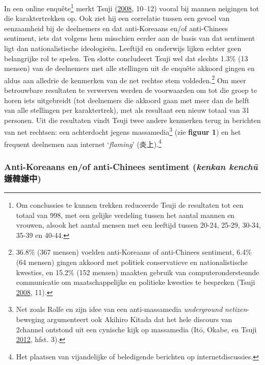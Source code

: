\documentclass[10.5pt,dutch,]{article}
\begin{document}
In een online enquête\footnote{Om conclussies te kunnen trekken
  reduceerde Tsuji de resultaten tot een totaal van 998, met een gelijke
  verdeling tussen het aantal mannen en vrouwen, alsook het aantal
  mensen met een leeftijd tussen 20-24, 25-29, 30-34, 35-39 en 40-44.}
merkt Tsuji (\protect\hyperlink{ref-tsujiux5fintanettoux5f2008}{2008},
10--12) vooral bij mannen neigingen tot die karaktertrekken op. Ook ziet
hij een correlatie tussen een gevoel van eenzaamheid bij de deelnemers
en dat anti-Koreaans en/of anti-Chinees sentiment, iets dat volgens hem
misschien eerder aan de basis van dat sentiment ligt dan
nationalistische ideologieën. Leeftijd en onderwijs lijken echter geen
belangrijke rol te spelen. Ten slotte concludeert Tsuji wel dat slechts
1.3\% (13 mensen) van de deelnemers met alle stellingen uit de enquête
akkoord gingen en aldus aan alledrie de kenmerken van de net rechtse
stem voldeden.\footnote{36.8\% (367 mensen) voelden anti-Koreaans of
  anti-Chinees sentiment, 6.4\% (64 mensen) gingen akkoord met politiek
  conservatieve en nationalistische kwesties, en 15.2\% (152 mensen)
  maakten gebruik van computerondersteunde communicatie om
  maatschappelijke en politieke kwesties te bespreken (Tsuji
  \protect\hyperlink{ref-tsujiux5fintanettoux5f2008}{2008}, 11).} Om
meer betrouwbare resultaten te verwerven werden de voorwaarden om tot
die groep te horen iets uitgebreidt (tot deelnemers die akkoord gaan met
meer dan de helft van alle stellingen per karaktertrek), met als
resultaat een nieuw totaal van 31 personen. Uit die resultaten vindt
Tsuji twee andere kenmerken terug in berichten van net rechtsen: een
achterdocht jegens massamedia\footnote{Net zoals Rolfe en zijn idee van
  een anti-massamedia \emph{underground} \emph{netizen}-beweging
  argumenteert ook Akihiro Kitada dat het hele discours van 2channel
  ontstond uit een cynische kijk op massamedia (Itō, Okabe, en Tsuji
  \protect\hyperlink{ref-itoux5ffandomux5f2012}{2012}, hfst. 3).} (zie
\textbf{figuur 1}) en het frequent deelnemen aan internet
`\emph{flaming}' (炎上).\footnote{Het plaatsen van vijandelijke of
  beledigende berichten op internetdiscussies.}

\subsubsection{\texorpdfstring{Anti-Koreaans en/of anti-Chinees
sentiment (\emph{kenkan kenchū}
嫌韓嫌中)}{Anti-Koreaans en/of anti-Chinees sentiment (kenkan kenchū 嫌韓嫌中)}}\label{anti-koreaans-enof-anti-chinees-sentiment-kenkan-kenchux16b-ux5accux97d3ux5accux4e2d}
\end{document}

